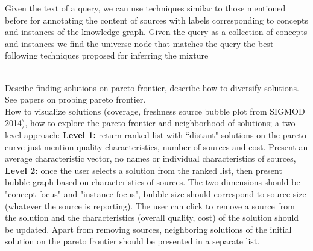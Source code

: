 \documentclass{sig-alternate}
\begin{document}
Given the text of a query, we can use techniques similar to those mentioned before for annotating the content of sources with labels corresponding to concepts and instances of the knowledge graph. Given the query as a collection of concepts and instances we find the universe node that matches the query the best following techniques proposed for inferring the mixture 

\ \\Descibe finding solutions on pareto frontier, describe how to diversify solutions. See papers on probing pareto frontier. 
\ \\How to visualize solutions (coverage, freshness source bubble plot from SIGMOD 2014), how to explore the pareto frontier and neighborhood of solutions; a two level approach: {\bf Level 1:} return ranked list with ``distant" solutions on the pareto curve just mention quality characteristics, number of sources and cost. Present an average characteristic vector, no names or individual characteristics of sources, {\bf Level 2:} once the user selects a solution from the ranked list, then present bubble graph based on characteristics of sources. The two dimensions should be "concept focus" and "instance focus", bubble size should correspond to source size (whatever the source is reporting). The user can click to remove a source from the solution and the characteristics (overall quality, cost) of the solution should be updated. Apart from removing sources, neighboring solutions of the initial solution on the pareto frontier should be presented in a separate list. 


\end{document}

